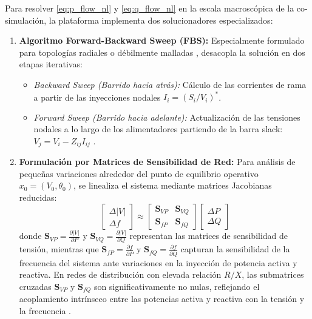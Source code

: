 Para resolver \eqref{eq:p_flow_nl} y \eqref{eq:q_flow_nl} en la escala macroscópica de la co-simulación, la plataforma implementa dos solucionadores especializados:
\begin{enumerate}[1.]
    \item \textbf{Algoritmo Forward-Backward Sweep (FBS):} Especialmente formulado para topologías radiales o débilmente malladas \citep{Glover2017}, desacopla la solución en dos etapas iterativas:
    \begin{itemize}
        \item \textit{Backward Sweep (Barrido hacia atrás):} Cálculo de las corrientes de rama a partir de las inyecciones nodales $I_i = (S_i / V_i)^*$.
        \item \textit{Forward Sweep (Barrido hacia adelante):} Actualización de las tensiones nodales a lo largo de los alimentadores partiendo de la barra slack: $V_j = V_i - Z_{ij} I_{ij}$ \citep{DiFazio2024Linear}.
    \end{itemize}
    
    \item \textbf{Formulación por Matrices de Sensibilidad de Red:} Para análisis de pequeñas variaciones alrededor del punto de equilibrio operativo $x_0 = (V_0, \theta_0)$, se linealiza el sistema mediante matrices Jacobianas reducidas:
    \begin{equation}
    \begin{bmatrix} \Delta |V| \\ \Delta f \end{bmatrix} \approx \begin{bmatrix} \mathbf{S}_{VP} & \mathbf{S}_{VQ} \\ \mathbf{S}_{fP} & \mathbf{S}_{fQ} \end{bmatrix} \begin{bmatrix} \Delta P \\ \Delta Q \end{bmatrix}
    \end{equation}
    donde $\mathbf{S}_{VP} = \frac{\partial |V|}{\partial P}$ y $\mathbf{S}_{VQ} = \frac{\partial |V|}{\partial Q}$ representan las matrices de sensibilidad de tensión, mientras que $\mathbf{S}_{fP} = \frac{\partial f}{\partial P}$ y $\mathbf{S}_{fQ} = \frac{\partial f}{\partial Q}$ capturan la sensibilidad de la frecuencia del sistema ante variaciones en la inyección de potencia activa y reactiva. En redes de distribución con elevada relación $R/X$, las submatrices cruzadas $\mathbf{S}_{VP}$ y $\mathbf{S}_{fQ}$ son significativamente no nulas, reflejando el acoplamiento intrínseco entre las potencias activa y reactiva con la tensión y la frecuencia \citep{Pompodakis2022Sensitivity}.
\end{enumerate}

